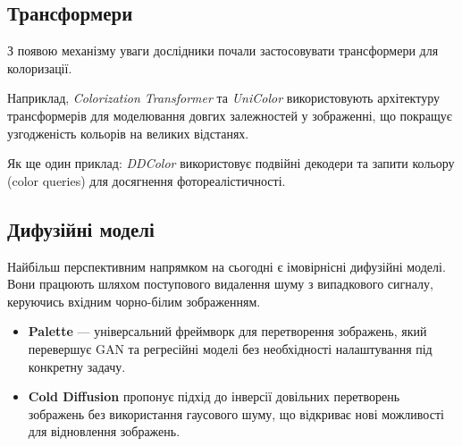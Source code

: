         \subsection{Трансформери}
            З появою механізму уваги дослідники почали застосовувати трансформери для колоризації.

            Наприклад, \textit{Colorization Transformer} \cite{2021-colorization-transformer} та \textit{UniColor} \cite{2022-unicolor} використовують архітектуру трансформерів для моделювання довгих залежностей у зображенні, що покращує узгодженість кольорів на великих відстанях.

            Як ще один приклад: \textit{DDColor} \cite{2023-ddcolor} використовує подвійні декодери та запити кольору (color queries) для досягнення фотореалістичності.

        \subsection{Дифузійні моделі}
            Найбільш перспективним напрямком на сьогодні є імовірнісні дифузійні моделі.
            Вони працюють шляхом поступового видалення шуму з випадкового сигналу, керуючись вхідним чорно-білим зображенням.
            \begin{itemize}[label=$\bullet$]
                \item \textbf{Palette} \cite{2022-palette-image-to-image-diffusion-models} --- універсальний фреймворк для перетворення зображень, який перевершує GAN та регресійні моделі без необхідності налаштування під конкретну задачу.
                \item \textbf{Cold Diffusion} \cite{2023-cold-diffusion} пропонує підхід до інверсії довільних перетворень зображень без використання гаусового шуму, що відкриває нові можливості для відновлення зображень.
            \end{itemize}



